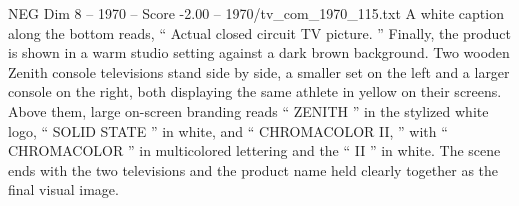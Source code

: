 \begin{textsample}{NEG Dim 8 – 1970 – Score -2.00 – 1970/tv\_com\_1970\_115.txt}
A white caption along the bottom reads, “ Actual closed circuit TV picture. ” Finally, the product is shown in a warm studio setting against a dark brown background.
Two wooden Zenith console televisions stand side by side, a smaller set on the left and a larger console on the right, both displaying the same athlete in yellow on their screens.
Above them, large on-screen branding reads “ ZENITH ” in the stylized white logo, “ SOLID STATE ” in white, and “ CHROMACOLOR II, ” with “ CHROMACOLOR ” in multicolored lettering and the “ II ” in white.
The scene ends with the two televisions and the product name held clearly together as the final visual image.

\end{textsample}
